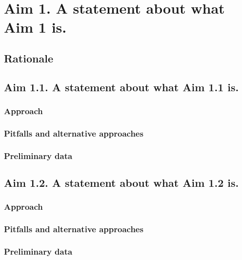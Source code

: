 \section{Aim 1. A statement about what Aim 1 is.}

\subsection*{Rationale}


\subsection*{Aim 1.1. A statement about what Aim 1.1 is.}

\subsubsection*{Approach}

\subsubsection*{Pitfalls and alternative approaches}

\subsubsection*{Preliminary data}


\subsection*{Aim 1.2. A statement about what Aim 1.2 is.}

\subsubsection*{Approach}

\subsubsection*{Pitfalls and alternative approaches}

\subsubsection*{Preliminary data}

